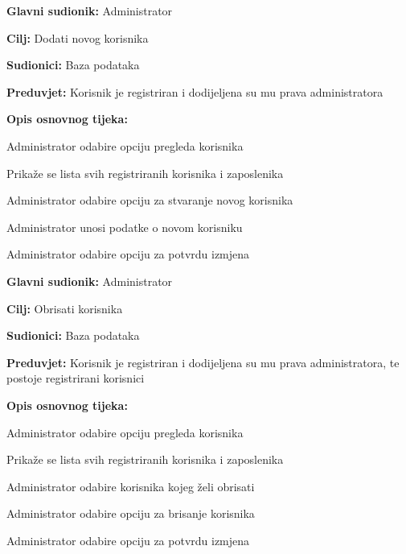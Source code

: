 \noindent {}
\begin{packed_item}
	
	\item \textbf{Glavni sudionik: } Administrator
	\item  \textbf{Cilj:} Dodati novog korisnika
	\item  \textbf{Sudionici:} Baza podataka
	\item  \textbf{Preduvjet:} Korisnik je registriran i dodijeljena su mu prava administratora
	\item  \textbf{Opis osnovnog tijeka:}
	
	\item[] \begin{packed_enum}
		
		\item Administrator odabire opciju pregleda korisnika
		\item Prikaže se lista svih registriranih korisnika i zaposlenika
		\item Administrator odabire opciju za stvaranje novog korisnika
		\item Administrator unosi podatke o novom korisniku
		\item Administrator odabire opciju za potvrdu izmjena
	\end{packed_enum}
\end{packed_item}

\noindent {}
\begin{packed_item}
	
	\item \textbf{Glavni sudionik: } Administrator
	\item  \textbf{Cilj:} Obrisati korisnika
	\item  \textbf{Sudionici:} Baza podataka
	\item  \textbf{Preduvjet:} Korisnik je registriran i dodijeljena su mu prava administratora, te postoje registrirani korisnici
	\item  \textbf{Opis osnovnog tijeka:}
	
	\item[] \begin{packed_enum}
		
		\item Administrator odabire opciju pregleda korisnika
		\item Prikaže se lista svih registriranih korisnika i zaposlenika
		\item Administrator odabire korisnika kojeg želi obrisati
		\item Administrator odabire opciju za brisanje korisnika
		\item Administrator odabire opciju za potvrdu izmjena
	\end{packed_enum}
\end{packed_item}

